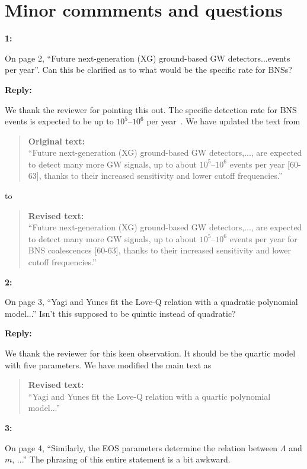 \documentclass[11pt]{article}
\newenvironment{reviewercomment}[1]{
    \vspace{1em}
    \noindent \textbf{#1:} \itshape
}{
    \par\vspace{0.5em}
}
\newenvironment{authorresponse}{
    \noindent \textbf{Reply:} \normalfont
}{
    \par\vspace{1.5em}
}
\newenvironment{originaltext}{
    \begin{quote}
    \color{oldcolor} \small \textbf{Original text:} \\
}{
    \end{quote}
}
\newenvironment{revisedtext}{
    \begin{quote}
    \color{revcolor} \small \textbf{Revised text:} \\
}{
    \end{quote}
}
\begin{document}
\section*{Minor commments and questions}
\begin{reviewercomment}{1}
    On page 2, ``Future next-generation (XG) ground-based GW detectors...events per year''. Can this be clarified as to what would be the specific rate for BNSs?
\end{reviewercomment}

\begin{authorresponse}
    We thank the reviewer for pointing this out. The specific detection rate for BNS events is expected to be up to $10^5$--$10^6$ per year~\cite{Samajdar:2021egv}. We have updated the text from
    \begin{originaltext}
        ``Future next-generation (XG) ground-based GW detectors,..., are
        expected to detect many more GW signals, up to about $10^5$--$10^6$ events per
        year [60-63], thanks to their increased sensitivity and lower cutoff
        frequencies.'' 
    \end{originaltext}
    to
    \begin{revisedtext}
        ``Future next-generation (XG) ground-based GW detectors,..., are expected to detect many more GW signals, up to about $10^5$--$10^6$ events per year for BNS coalescences [60-63], thanks to their increased sensitivity and lower cutoff frequencies.''
    \end{revisedtext}
\end{authorresponse}


\begin{reviewercomment}{2}
    On page 3, ``Yagi and Yunes fit the Love-Q relation with a quadratic polynomial model...'' Isn't this supposed to be quintic instead of quadratic?
\end{reviewercomment}

\begin{authorresponse}
    We thank the reviewer for this keen observation. It should be the quartic
    model with five parameters. We have modified the main text as
    \begin{revisedtext}
        ``Yagi and Yunes fit the Love-Q relation with a quartic polynomial model...''
    \end{revisedtext}
\end{authorresponse}


\begin{reviewercomment}{3}
    On page 4, ``Similarly, the EOS parameters determine the relation between $\Lambda$ and $m$, ...'' The phrasing of this entire statement is a bit awkward. 
\end{reviewercomment}
\end{document}
